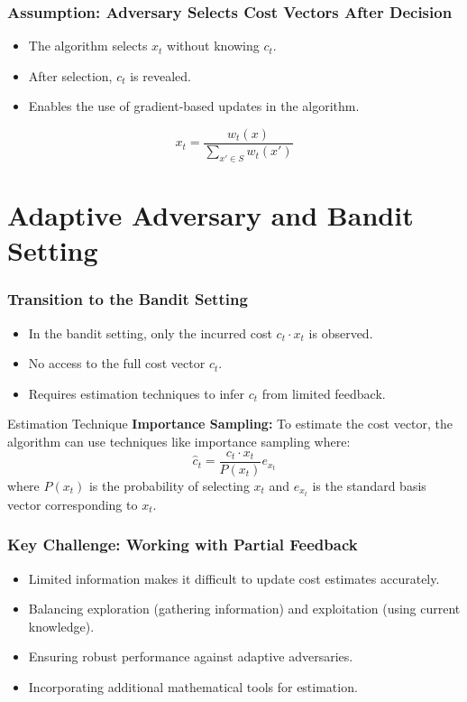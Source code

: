 \documentclass{beamer}
\begin{document}
\begin{frame}
\frametitle{Assumption: Adversary Selects Cost Vectors After Decision}
\begin{itemize}
    \item The algorithm selects \( x_t \) without knowing \( c_t \).
    \item After selection, \( c_t \) is revealed.
    \item Enables the use of gradient-based updates in the algorithm.
\end{itemize}
\begin{equation*}
    x_t = \frac{w_t(x)}{\sum_{x' \in S} w_t(x')}
\end{equation*}
\end{frame}

\section{Adaptive Adversary and Bandit Setting}

\begin{frame}
\frametitle{Transition to the Bandit Setting}
\begin{itemize}
    \item In the bandit setting, only the incurred cost \( c_t \cdot x_t \) is observed.
    \item No access to the full cost vector \( c_t \).
    \item Requires estimation techniques to infer \( c_t \) from limited feedback.
\end{itemize}
\begin{exampleblock}{Estimation Technique}
    \textbf{Importance Sampling:} To estimate the cost vector, the algorithm can use techniques like importance sampling where:
    \[
    \hat{c}_t = \frac{c_t \cdot x_t}{P(x_t)} e_{x_t}
    \]
    where \( P(x_t) \) is the probability of selecting \( x_t \) and \( e_{x_t} \) is the standard basis vector corresponding to \( x_t \).
\end{exampleblock}
\end{frame}

\begin{frame}
\frametitle{Key Challenge: Working with Partial Feedback}
\begin{itemize}
    \item Limited information makes it difficult to update cost estimates accurately.
    \item Balancing exploration (gathering information) and exploitation (using current knowledge).
    \item Ensuring robust performance against adaptive adversaries.
    \item Incorporating additional mathematical tools for estimation.
\end{itemize}
\end{frame}
\end{document}
